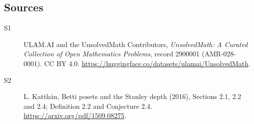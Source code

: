 \documentclass[11pt]{article}
\begin{document}
\subsection{Sources}
\begin{description}
\item[\hypertarget{source:2900001:1}{S1}] ULAM.AI and the UnsolvedMath Contributors, \emph{UnsolvedMath: A Curated Collection of Open Mathematics Problems}, record 2900001 (AMR-028-0001). CC BY 4.0. \url{https://huggingface.co/datasets/ulamai/UnsolvedMath}.
\item[\hypertarget{source:2900001:2}{S2}] L. Katthän, Betti posets and the Stanley depth (2016), Sections 2.1, 2.2 and 2.4; Definition 2.2 and Conjecture 2.4. \url{https://arxiv.org/pdf/1509.08275}.
\end{description}
\label{end:2900001}
\end{document}
